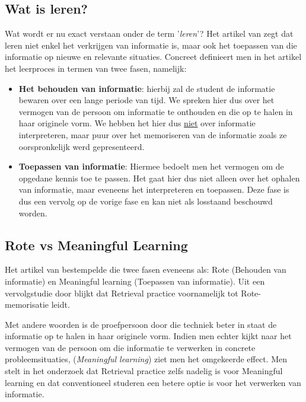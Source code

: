 \documentclass{hogent-article}
\begin{document}
\subsection{Wat is leren?}
Wat wordt er nu exact verstaan onder de term '\textit{leren}'? Het artikel van \textcite{Mayer_2002} zegt dat leren niet enkel het verkrijgen van informatie is, maar ook het toepassen van die informatie op nieuwe en relevante situaties. Concreet definieert men in het artikel het leerproces in termen van twee fasen, namelijk:\\

\begin{itemize}
	\item \textbf{Het behouden van informatie}: hierbij zal de student de informatie bewaren over een lange periode van tijd. We spreken hier dus over het vermogen van de persoon om informatie te onthouden en die op te halen in haar originele vorm. We hebben het hier dus \underline{niet} over informatie interpreteren, maar puur over het memoriseren van de informatie zoals ze oorspronkelijk werd gepresenteerd.\\
	
	\item \textbf{Toepassen van informatie}: Hiermee bedoelt men het vermogen om de opgedane kennis toe te passen. Het  gaat hier dus niet alleen over het ophalen van informatie, maar eveneens het interpreteren en toepassen. Deze fase is dus een vervolg op de vorige fase en kan niet als losstaand beschouwd worden.
\end{itemize}

\subsection{Rote vs Meaningful Learning}
\label{RoteVSMeaningful}
Het artikel van \textcite{Mayer_2002} bestempelde die twee fasen eveneens als: Rote (Behouden van informatie) en Meaningful learning (Toepassen van informatie). Uit een vervolgstudie door \textcite{van_Gog_2012} blijkt dat Retrieval practice voornamelijk tot Rote-memorisatie leidt.\\

\par
\noindent
Met andere woorden is de proefpersoon door die techniek beter in staat de informatie op te halen in haar originele vorm. Indien men echter kijkt naar het vermogen van de persoon om die informatie te verwerken in concrete probleemsituaties, (\textit{Meaningful learning}) ziet men het omgekeerde effect. Men stelt in het onderzoek dat Retrieval practice zelfs nadelig is voor Meaningful learning en dat conventioneel studeren een betere optie is voor het verwerken van informatie.
\par
\noindent
\end{document}
